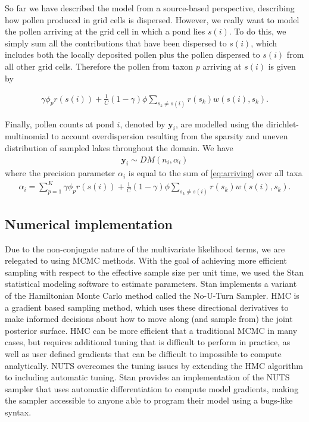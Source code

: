 \documentclass[12pt]{article}
\begin{document}

So far we have described the model from a source-based perspective,
describing how pollen produced in grid cells is dispersed. However, we
really want to model the pollen arriving at the grid cell in which a
pond lies $s(i)$. To do this, we simply sum all the contributions that
have been dispersed to $s(i)$, which includes both the locally
deposited pollen plus the pollen dispersed to $s(i)$ from all other
grid cells. Therefore the pollen from taxon $p$ arriving at $s(i)$ is
given by

\begin{align}
\gamma \phi_p r(s(i)) + \frac{1}{C} (1-\gamma) \phi \sum_{s_k \neq s(i) } r(s_k) w(s(i), s_k).
\label{eq:arriving}
\end{align}

Finally, pollen counts at pond $i$, denoted by $\bm{y}_i$, are
modelled using the dirichlet-multinomial to account overdispersion
resulting from the sparsity and uneven distribution of sampled lakes
throughout the domain. We have
\begin{align}
\bm{y}_i \sim DM (n_i, \alpha_i)
\label{eq:DM}
\end{align}
where the precision parameter $\alpha_i$ is equal to the sum of \ref{eq:arriving} over all taxa
\begin{align}
\alpha_i = \sum_{p=1}^K \gamma \phi_p r(s(i)) + \frac{1}{C} (1-\gamma) \phi \sum_{s_k \neq s(i) } r(s_k) w(s(i), s_k).
\label{eq:arriving}
\end{align}

\subsection{Numerical implementation}

Due to the non-conjugate nature of the multivariate likelihood terms,
we are relegated to using MCMC methods. With the goal of achieving
more efficient sampling with respect to the effective sample size per
unit time, we used the Stan statistical modeling software to estimate
parameters. Stan implements a variant of the Hamiltonian Monte Carlo
method called the No-U-Turn Sampler. HMC is a gradient based sampling
method, which uses these directional derivatives to make informed
decisions about how to move along (and sample from) the joint
posterior surface. HMC can be more efficient that a traditional MCMC
in many cases, but requires additional tuning that is difficult to
perform in practice, as well as user defined gradients that can be
difficult to impossible to compute analytically. NUTS overcomes the
tuning issues by extending the HMC algorithm to including automatic
tuning. Stan provides an implementation of the NUTS sampler that uses
automatic differentiation to compute model gradients, making the
sampler accessible to anyone able to program their model using a
bugs-like syntax.
\end{document}
